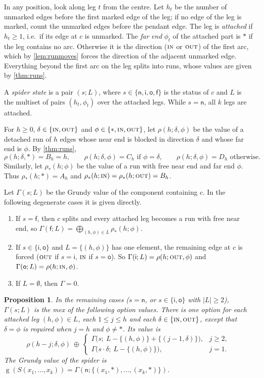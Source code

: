 \documentclass[11pt]{amsart}
\newtheorem{proposition}[theorem]{Proposition}
\theoremstyle{definition}
\theoremstyle{remark}
\newcommand{\gv}{\operatorname{g}}           %
\newcommand{\sn}{\mathsf{n}}
\newcommand{\si}{\mathsf{i}}
\newcommand{\so}{\mathsf{o}}
\newcommand{\sff}{\mathsf{f}}
\newcommand{\Sp}{S}
\newcommand{\free}{\ast}
\newcommand{\IN}{\textup{\textsc{in}}}
\newcommand{\OUT}{\textup{\textsc{out}}}
\begin{document}
In any position, look along leg $t$ from the centre. Let $h_t$ be the number of unmarked edges before the first marked edge of the leg; if no edge of the leg is marked, count the unmarked edges before the pendant edge. The leg is \emph{attached} if $h_t\ge1$, i.e.\ if its edge at $c$ is unmarked. The \emph{far end} $\phi_t$ of the attached part is $\free$ if the leg contains no arc. Otherwise it is the direction ($\IN$ or $\OUT$) of the first arc, which by \cref{lem:runmoves} forces the direction of the adjacent unmarked edge. Everything beyond the first arc on the leg splits into runs, whose values are given by \cref{thm:runs}.

A \emph{spider state} is a pair $(s;L)$, where $s\in\{\sn,\si,\so,\sff\}$ is the status of $c$ and $L$ is the multiset of pairs $(h_t,\phi_t)$ over the attached legs. While $s=\sn$, all $k$ legs are attached.

For $h\ge0$, $\delta\in\{\IN,\OUT\}$ and $\phi\in\{\free,\IN,\OUT\}$, let $\rho(h;\delta,\phi)$ be the value of a detached run of $h$ edges whose near end is blocked in direction $\delta$ and whose far end is $\phi$. By \cref{thm:runs},
\[
\rho(h;\delta,\free)=B_h=h,\qquad \rho(h;\delta,\phi)=C_h \text{ if } \phi=\delta,\qquad \rho(h;\delta,\phi)=D_h \text{ otherwise}.
\]
Similarly, let $\rho_\free(h;\phi)$ be the value of a run with free near end and far end $\phi$. Thus $\rho_\free(h;\free)=A_h$ and $\rho_\free(h;\IN)=\rho_\free(h;\OUT)=B_h$.

Let $\Gamma(s;L)$ be the Grundy value of the component containing $c$. In the following degenerate cases it is given directly.
\begin{enumerate}[label=(N\arabic*),leftmargin=*]
\item If $s=\sff$, then $c$ splits and every attached leg becomes a run with free near end, so $\Gamma(\sff;L)=\bigoplus_{(h,\phi)\in L}\rho_\free(h;\phi)$.
\item If $s\in\{\si,\so\}$ and $L=\{(h,\phi)\}$ has one element, the remaining edge at $c$ is forced ($\OUT$ if $s=\si$, $\IN$ if $s=\so$). So $\Gamma(\si;L)=\rho(h;\OUT,\phi)$ and $\Gamma(\so;L)=\rho(h;\IN,\phi)$.
\item If $L=\emptyset$, then $\Gamma=0$.
\end{enumerate}

\begin{proposition}\label{prop:spiderrec}
In the remaining cases ($s=\sn$, or $s\in\{\si,\so\}$ with $|L|\ge2$), $\Gamma(s;L)$ is the mex of the following option values. There is one option for each attached leg $(h,\phi)\in L$, each $1\le j\le h$ and each $\delta\in\{\IN,\OUT\}$, except that $\delta=\phi$ is required when $j=h$ and $\phi\ne\free$. Its value is
\[
  \rho(h-j;\delta,\phi)\ \oplus\ \begin{cases}
  \Gamma\bigl(s;\ L-\{(h,\phi)\}+\{(j-1,\delta)\}\bigr), & j\ge2,\\[2pt]
  \Gamma\bigl(s\cdot\delta;\ L-\{(h,\phi)\}\bigr), & j=1.
  \end{cases}
\]
The Grundy value of the spider is $\gv(\Sp(x_1,\dots,x_k))=\Gamma(\sn;\{(x_1,\free),\dots,(x_k,\free)\})$.
\end{proposition}
\end{document}

